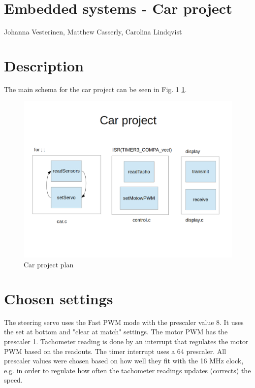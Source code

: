 \documentclass[11pt,a4paper]{report}
\begin{document}
\section*{Embedded systems - Car project}
Johanna Vesterinen, Matthew Casserly, Carolina Lindqvist\\

\section*{Description}
The main schema for the car project can be seen in Fig. 1 \ref{car}.

\begin{figure}[h!]
\label{car}
\centering
\includegraphics[scale=0.5]{car-schema.png}
\caption{Car project plan}
\end{figure}

\section*{Chosen settings}
The steering servo uses the Fast PWM mode with the prescaler value 8. It uses the set at bottom and "clear at match" settings. 
The motor PWM has the prescaler 1. Tachometer reading is done by an interrupt that regulates the motor PWM based on the readouts. The timer interrupt uses a \/64 prescaler. All prescaler values were chosen based on how well they fit with the 16 MHz clock, e.g. in order to regulate how often the tachometer readings updates (corrects) the speed.
\end{document}
